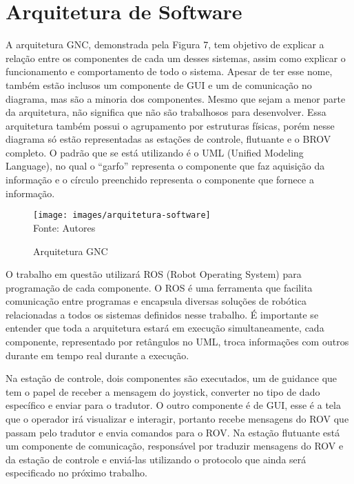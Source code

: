 \section{Arquitetura de Software}
\label{sec:arquitetura-software}

A arquitetura GNC, demonstrada pela Figura 7, tem objetivo de explicar a relação entre os componentes de cada um desses sistemas, assim como explicar o funcionamento e comportamento de todo o sistema. Apesar de ter esse nome, também estão inclusos um componente de GUI e um de comunicação no diagrama, mas são a minoria dos componentes. Mesmo que sejam a menor parte da arquitetura, não significa que não são trabalhosos para desenvolver. Essa arquitetura também possui o agrupamento por estruturas físicas, porém nesse diagrama só estão representadas as estações de controle, flutuante e o BROV completo. O padrão que se está utilizando é o UML (Unified Modeling Language), no qual o “garfo” representa o componente que faz aquisição da informação e o círculo preenchido representa o componente que fornece a informação.

\begin{figure}[h]
	\centering
	\caption[Arquitetura GNC]{Arquitetura GNC}
	\label{fig:arquitetura-software}
	\texttt{[image: images/arquitetura-software]}\\
	\footnotesize Fonte: Autores
\end{figure}

O trabalho em questão utilizará ROS (Robot Operating System) para programação de cada componente. O ROS é uma ferramenta que facilita comunicação entre programas e encapsula diversas soluções de robótica relacionadas a todos os sistemas definidos nesse trabalho. É importante se entender que toda a arquitetura estará em execução simultaneamente, cada componente, representado por retângulos no UML, troca informações com outros durante em tempo real durante a execução.

Na estação de controle, dois componentes são executados, um de guidance que tem o papel de receber a mensagem do joystick, converter no tipo de dado específico e enviar para o tradutor. O outro componente é de GUI, esse é a tela que o operador irá visualizar e interagir, portanto recebe mensagens do ROV que passam pelo tradutor e envia comandos para o ROV.  Na estação flutuante está um componente de comunicação, responsável por traduzir mensagens do ROV e da estação de controle e enviá-las utilizando o protocolo que ainda será especificado no próximo trabalho.

